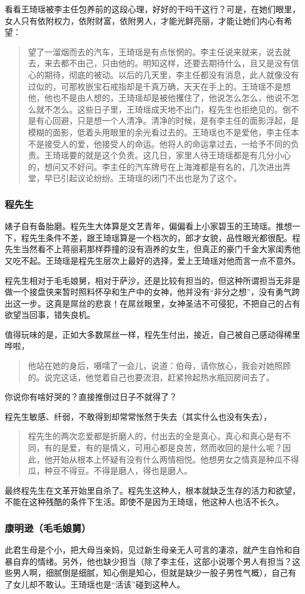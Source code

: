 看看王琦瑶被李主任包养前的这段心理，好好的干吗干这行？可是，在她们眼里，女人只有依附权力，依附财富，依附男人，才能光鲜亮丽，才能让她们内心有希望：
\begin{quotation}
望了一溜烟而去的汽车，王琦瑶是有点怅惘的。李主任说来就来，说去就去，来去都不由己，只由他的。明知这样，还要去期待什么，且又是没有信心的期待，彻底的被动。以后的几天里，李主任都没有消息，此人就像没有过似的，可那枚嵌宝石戒指却是千真万确，天天在手上的。王琦瑶不是想他，他也不是由人想的，王琦瑶却是被他攫住了，他说怎么怎么，他说不怎么就不怎么。这些日子里，王琦瑶成天地不出门，程先生也拒绝见的。倒不是有心回避，只是想一个人清净。清净的时候，是有李主任的面影浮起，是模糊的面影，低着头用眼里的余光看过去的。王琦瑶也不是爱他，李主任本不是接受人的爱，他接受人的命运。他将人的命运拿过去，一给予不同的负责。王琦瑶要的就是这个负责。这几日，家里人待王琦瑶都是有几分小心的，想问又不好问。李主任的汽车牌号在上海滩都是有名的，几次进出弄堂，早已引起议论纷纷。王琦瑶的闭门不出也是为了这个。
\end{quotation}

\subsubsection{程先生}

婊子自有备胎磨。程先生大体算是文艺青年，偏偏看上小家碧玉的王琦瑶。推想一下，程先生条件不差，跟王琦瑶算是一个档次的，郎才女貌，品性眼光都很配。程先生当然看不上蒋丽莉那样莽撞的没有涵养的女生，但真正的豪门千金大家闺秀他又吃不起。王琦瑶是程先生层次上最好的选择，爱上王琦瑶对他而言一点不意外。

程先生相对于毛毛娘舅，相对于萨沙，还是比较有担当的，但这种所谓担当无非是做一个接盘侠来暂时照料怀孕和生产中的女神，他并没有“非分之想”，没有勇气跨出这一步。这真是屌丝的悲哀！在屌丝眼里，女神圣洁不可侵犯，不把自己的占有欲望当回事，错失良机。

值得玩味的是，正如大多数屌丝一样，程先生付出，接近，自己被自己感动得稀里哗啦，
\begin{quotation}
他站在她的身后，嗫嚅了一会儿，说道：伯母，请你放心，我会对她照顾的。说完这话，他觉着自己也要流泪，赶紧拎起热水瓶回房间去了。
\end{quotation}
你说你有啥好哭的？直接推倒过日子不就得了？

程先生敏感、纤弱，不敢得到却常常怅然于失去（其实什么也没有失去），
\begin{quotation}
程先生的两次恋爱都是折磨人的，付出去的全是真心，真心和真心是有不同，有的是爱，有的是情义，可用心都是良苦，然而收回的是什么呢？因此，他开始从根本上怀疑有没有什么两情相悦。他想男女之情真是种瓜不得瓜，种豆不得豆。不得是磨人，得也是磨人。
\end{quotation}
最终程先生在文革开始里自杀了。程先生这种人，根本就缺乏生存的活力和欲望，不能在这种残酷的条件下生活。即使不是因为王琦瑶，他这种人也活不长久。

\subsubsection{康明逊（毛毛娘舅）}

此君生母是个小，把大母当亲妈，见过新生母亲无人可言的凄凉，就产生自怜和自暴自弃的情绪。另外，他也缺少担当（除了李主任，这部小说哪个男人有担当？这些男人啊，细腻倒是细腻，知心倒是知心，但就是缺少一股子男性气概），自己有了女儿却不敢认。王琦瑶也是“活该”碰到这种人。